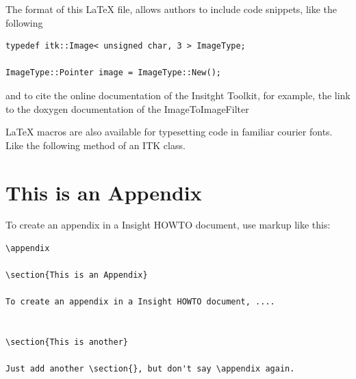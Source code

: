 \documentclass{InsightArticle}
\begin{document}
The format of this LaTeX file, allows authors to include code snippets, like
the following

\begin{verbatim}
typedef itk::Image< unsigned char, 3 > ImageType;

ImageType::Pointer image = ImageType::New();
\end{verbatim}

and to cite the online documentation of the Insitght Toolkit, for example, the
link to the doxygen documentation of the ImageToImageFilter


LaTeX macros are also available for typesetting code in familiar courier fonts.
Like the following method of an ITK class.







\appendix

\section{This is an Appendix}

To create an appendix in a Insight HOWTO document, use markup like
this:

\begin{verbatim}
\appendix

\section{This is an Appendix}

To create an appendix in a Insight HOWTO document, ....


\section{This is another}

Just add another \section{}, but don't say \appendix again.
\end{verbatim}
\end{document}
